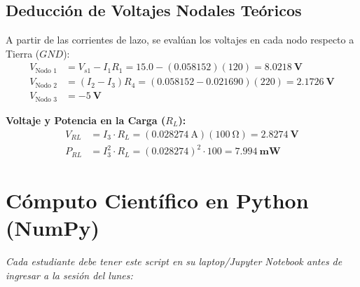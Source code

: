 \documentclass[11pt, a4paper]{article}
\begin{document}
\subsection{Deducción de Voltajes Nodales Teóricos}
A partir de las corrientes de lazo, se evalúan los voltajes en cada nodo respecto a Tierra ($GND$):
\begin{align*}
    V_{\text{Nodo 1}} &= V_{s1} - I_1 R_1 = 15.0 - (0.058152)(120) = \mathbf{\qty{8.0218}{\volt}} \\
    V_{\text{Nodo 2}} &= (I_2 - I_3)R_4 = (0.058152 - 0.021690)(220) = \mathbf{\qty{2.1726}{\volt}} \\
    V_{\text{Nodo 3}} &= \mathbf{\qty{-5}{\volt}}
\end{align*}

\textbf{Voltaje y Potencia en la Carga ($R_L$):}
\begin{align*}
    V_{RL} &= I_3 \cdot R_L = (\qty{0.028274}{\ampere})(\qty{100}{\ohm}) = \mathbf{\qty{2.8274}{\volt}} \\
    P_{RL} &= I_3^2 \cdot R_L = (0.028274)^2 \cdot 100 = \mathbf{\qty{7.994}{\milli\watt}}
\end{align*}

\section{Cómputo Científico en Python (NumPy)}
\textit{Cada estudiante debe tener este script en su laptop/Jupyter Notebook antes de ingresar a la sesión del lunes:}
\end{document}
